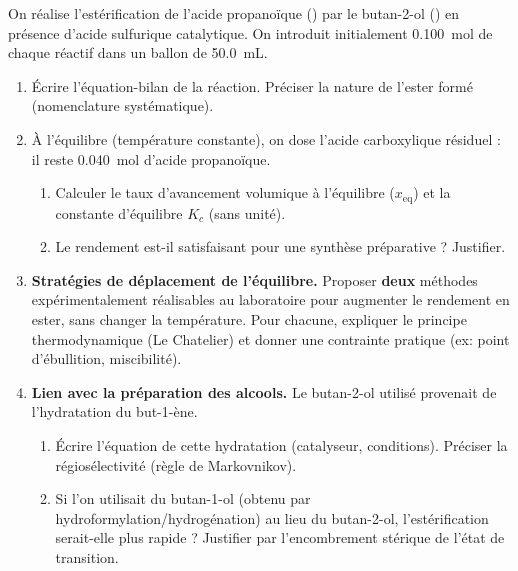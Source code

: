 \documentclass[11pt]{article}
\begin{document}
\begin{exercice}
On réalise l'estérification de l'acide propanoïque () par le butan-2-ol () en présence d'acide sulfurique catalytique. On introduit initialement \SI{0,100}{\mol} de chaque réactif dans un ballon de \SI{50,0}{\mL}.
\begin{enumerate}
    \item Écrire l'équation-bilan de la réaction. Préciser la nature de l'ester formé (nomenclature systématique).
    \item À l'équilibre (température constante), on dose l'acide carboxylique résiduel : il reste \SI{0,040}{\mol} d'acide propanoïque.
    \begin{enumerate}
        \item Calculer le taux d'avancement volumique à l'équilibre ($x_{\text{eq}}$) et la constante d'équilibre $K_c$ (sans unité).
        \item Le rendement est-il satisfaisant pour une synthèse préparative ? Justifier.
    \end{enumerate}
    \item \textbf{Stratégies de déplacement de l'équilibre.} Proposer \textbf{deux} méthodes expérimentalement réalisables au laboratoire pour augmenter le rendement en ester, sans changer la température. Pour chacune, expliquer le principe thermodynamique (Le Chatelier) et donner une contrainte pratique (ex: point d'ébullition, miscibilité).
    \item \textbf{Lien avec la préparation des alcools.} Le butan-2-ol utilisé provenait de l'hydratation du but-1-ène.
    \begin{enumerate}
        \item Écrire l'équation de cette hydratation (catalyseur, conditions). Préciser la régiosélectivité (règle de Markovnikov).
        \item Si l'on utilisait du butan-1-ol (obtenu par hydroformylation/hydrogénation) au lieu du butan-2-ol, l'estérification serait-elle plus rapide ? Justifier par l'encombrement stérique de l'état de transition.
    \end{enumerate}
\end{enumerate}
\end{exercice}
\end{document}
